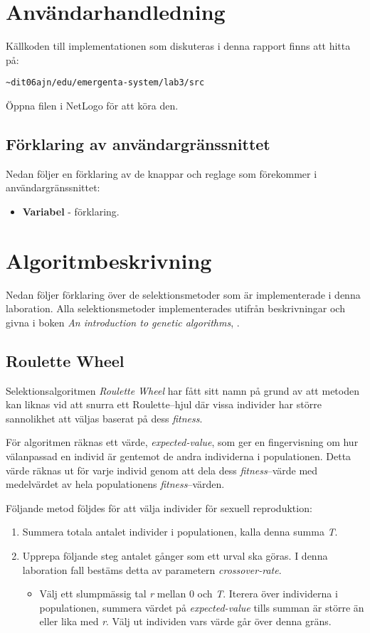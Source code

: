 \documentclass[titlepage, a4paper, 12pt]{article}
\begin{document}
\section{Användarhandledning}
Källkoden till implementationen som diskuteras i denna rapport finns
att hitta på:

\verb!~dit06ajn/edu/emergenta-system/lab3/src!

Öppna filen i NetLogo för att köra den.

\subsection{Förklaring av användargränssnittet}
Nedan följer en förklaring av de knappar och reglage som förekommer i
användargränssnittet:

\begin{itemize}
\item \textbf{Variabel} - förklaring.
\end{itemize}

\section{Algoritmbeskrivning}
Nedan följer förklaring över de selektionsmetoder som är
implementerade i denna laboration. Alla selektionsmetoder
implementerades utifrån beskrivningar och givna i boken \textit{An
  introduction to genetic algorithms}, \cite{gen-intro}.

\subsection{Roulette Wheel}\label{sec:roulette-wheel}
Selektionsalgoritmen \textit{Roulette Wheel} har fått sitt namn på
grund av att metoden kan liknas vid att snurra ett Roulette–hjul där
vissa individer har större sannolikhet att väljas baserat på dess
\textit{fitness}.

För algoritmen räknas ett värde, \textit{expected-value}, som ger en
fingervisning om hur välanpassad en individ är gentemot de andra
individerna i populationen. Detta värde räknas ut för varje individ
genom att dela dess \textit{fitness}–värde med medelvärdet av hela
populationens \textit{fitness}–värden.

Följande metod följdes för att välja individer för sexuell
reproduktion:

\begin{enumerate}
\item Summera totala antalet individer i populationen, kalla denna
  summa \textit{T}.
\item Upprepa följande steg antalet gånger som ett urval ska göras. I
  denna laboration fall bestäms detta av parametern
  \textit{crossover-rate}.
  \begin{itemize}
  \item Välj ett slumpmässig tal \textit{r} mellan 0 och
    \textit{T}. Iterera över individerna i populationen, summera
    värdet på \textit{expected-value} tills summan är större än eller
    lika med \textit{r}. Välj ut individen vars värde går över denna gräns.
  \end{itemize}
\end{enumerate}
\end{document}
